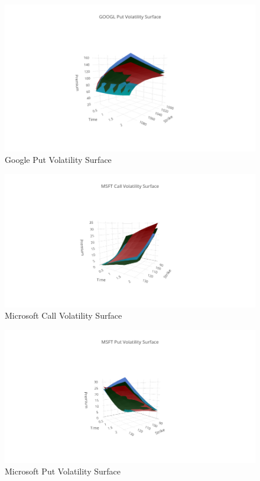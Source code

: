 \documentclass{article}
\begin{document}
\begin{figure}[h!]
\includegraphics[width =\textwidth]{images/VolSurface/GOOGLPut.png}
\caption{Google Put Volatility Surface}
\centering
\end{figure}
\begin{figure}[h!]
\includegraphics[width =\textwidth]{images/VolSurface/MSFTCall.png}
\caption{Microsoft Call Volatility Surface}
\centering
\end{figure}
\begin{figure}[h!]
\includegraphics[width =\textwidth]{images/VolSurface/MSFTPut.png}
\caption{Microsoft Put Volatility Surface}
\centering
\end{figure}
\end{document}
